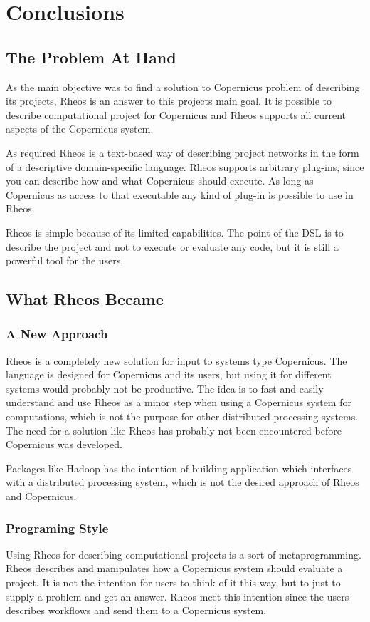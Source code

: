 \chapter{Conclusions}

\section{The Problem At Hand}
As the main objective was to find a solution to Copernicus problem of
describing its projects, Rheos is an answer to this projects main
goal. It is possible to describe computational project for Copernicus
and Rheos supports all current aspects of the Copernicus system.

As required Rheos is a text-based way of describing project networks
in the form of a descriptive domain-specific language. Rheos supports
arbitrary plug-ins, since you can describe how and what Copernicus
should execute. As long as Copernicus as access to that executable any
kind of plug-in is possible to use in Rheos.

Rheos is simple because of its limited capabilities. The point of the
DSL is to describe the project and not to execute or evaluate any
code, but it is still a powerful tool for the users.


\section{What Rheos Became}

\subsection{A New Approach}
Rheos is a completely new solution for input to systems type
Copernicus. The language is designed for Copernicus and its users, but
using it for different systems would probably not be productive. The
idea is to fast and easily understand and use Rheos as a minor step
when using a Copernicus system for computations, which is not the
purpose for other distributed processing systems. The need for a
solution like Rheos has probably not been encountered before
Copernicus was developed.

Packages like Hadoop has the intention of building application which
interfaces with a distributed processing system, which is not the
desired approach of Rheos and Copernicus.

\subsection{Programing Style}
Using Rheos for describing computational projects is a sort of
metaprogramming. Rheos describes and manipulates how a Copernicus
system should evaluate a project. It is not the intention for users
to think of it this way, but to just to supply a problem and get an
answer. Rheos meet this intention since the users describes workflows
and send them to a Copernicus system.

